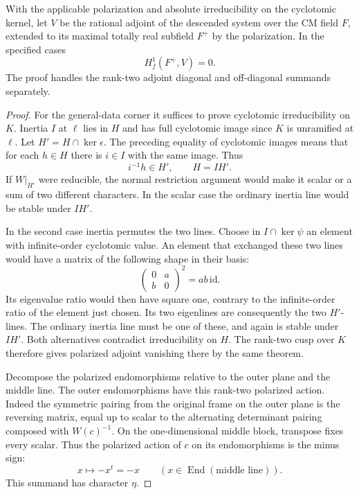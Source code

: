\begin{lemma}
\label{lem:descended-adjoint-vanishing}
With the applicable polarization and absolute irreducibility
on the cyclotomic kernel, let \(V\) be the rational adjoint of the descended system over the CM field \(F\),
extended to its maximal totally real subfield \(F^+\) by the polarization.
In the specified cases
\[
                            H_f^1(F^+,V)=0 .
\] The proof
handles the rank-two adjoint diagonal and off-diagonal
summands separately.
\end{lemma}

\begin{proof}
For the general-data corner it suffices to prove cyclotomic
irreducibility on \(K\). Inertia \(I\) at \(\ell\) lies
in \(H\) and has full cyclotomic image since \(K\) is
unramified at \(\ell\). Let \(H'=H\cap\ker\epsilon\). The preceding equality of cyclotomic images means that for each \(h\in H\) there is \(i\in I\) with the same image. Thus
\[
 i^{-1}h\in H',\qquad H=IH'.
\] If \(W|_{H'}\) were reducible,
the normal restriction argument would make it scalar or a
sum of two different characters. In the scalar case the
ordinary inertia line would be stable under \(I H'\).

In
the second case inertia permutes the two lines. Choose in
\(I\cap\ker\psi\) an element with infinite-order cyclotomic
value. An element that exchanged these two lines would have a matrix of the following shape in their basis:
\[
 \begin{pmatrix}0&a\\ b&0\end{pmatrix}^{\!2}=ab\,\mathrm{id}.
\]
Its eigenvalue ratio would then have square one, contrary to the infinite-order ratio of the element just chosen. Its two eigenlines are consequently the
two \(H'\)-lines. The ordinary inertia line must be one of
these, and again is stable under \(I H'\). Both alternatives
contradict irreducibility on \(H\). The rank-two cusp over
\(K\) therefore gives polarized adjoint vanishing there
by the same theorem.

Decompose the polarized endomorphisms relative to the
outer plane and the middle line. The outer endomorphisms
have this rank-two polarized action. Indeed the symmetric
pairing from the original frame on the outer plane is the
reversing matrix, equal up to scalar to the alternating
determinant pairing composed with \(W(c)^{-1}\).
On the one-dimensional middle block, transpose fixes every scalar. Thus the polarized action of \(c\) on its endomorphisms is the minus sign:
\[
 x\longmapsto-x^t=-x\qquad(x\in\operatorname{End}(\text{middle line})).
\]
This summand has character \(\eta\).


\end{proof}
